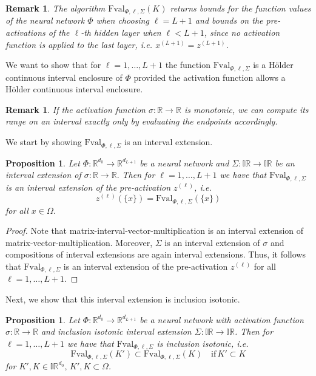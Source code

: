 \documentclass[a4paper, 11pt]{article}
\newtheorem{proposition}[theorem]{Proposition}
\newtheorem{remark}[theorem]{Remark}
\begin{document}
	\begin{remark}
		The algorithm $\mathrm{Fval}_{\Phi,\ell, \Sigma}(K)$ returns bounds for the function values of the neural network $\Phi$ when choosing $\ell=L+1$ and bounds on the pre-activations of the $\ell$-th hidden layer when $\ell < L+1$, since no activation function is applied to the last layer, i.e. $x^{(L+1)} = z^{(L+1)}$.
	\end{remark}
	
	
	
	
	We want to show that for $\ell=1,\dotsc,L+1$ the function $\mathrm{Fval}_{\Phi, \ell, \Sigma}$ is a Hölder continuous interval enclosure of $\Phi$ {provided} the activation function allows a Hölder continuous interval enclosure.
	\begin{remark}\label{rem:monotonicSigma}
		If the activation function $\sigma : \mathbb{R} \to \mathbb{R}$ is monotonic, we can compute its range on an interval exactly only by evaluating the endpoints accordingly.
	\end{remark}
	
	We start by showing $\mathrm{Fval}_{\Phi, \ell, \Sigma}$ is an interval extension.
	
	\begin{proposition}\label{prop: fval interval extension}
		Let $\Phi : \mathbb{R}^{d_0} \to \mathbb{R}^{d_{L+1}}$ be a neural network and $\Sigma:\mathbb{IR} \to \mathbb{IR}$ be an interval extension of $\sigma : \mathbb{R} \to \mathbb{R}.$ Then for $\ell=1,\dotsc, L+1$ we have that $\mathrm{Fval}_{\Phi, \ell, \Sigma}$ is {an} interval extension of the pre-activation $z^{(\ell)}$, i.e.
		$$ z^{(\ell)}(\{x\}) = \mathrm{Fval}_{\Phi, \ell, \Sigma}(\{x\}) $$
		for all $x\in \Omega$.
	\end{proposition}
	
	\begin{proof}
		Note that matrix-interval-vector-multiplication is an interval extension of
		matrix-vector-multiplication. Moreover, $\Sigma$ is an interval extension of $\sigma$ and compositions of interval extensions are again interval extensions. Thus, it follows that $\mathrm{Fval}_{\Phi, \ell, \Sigma}$ is an interval extension of the pre-activation $z^{(\ell)}$ for all $\ell =1, \dots, L+1$.
	\end{proof}
	
	Next, we show that this interval extension is inclusion isotonic.
	
	\begin{proposition}\label{prop: fval inclusion isotonic}
		Let $\Phi : \mathbb{R}^{d_0} \to \mathbb{R}^{d_{L+1}}$ be a neural network with activation function $\sigma : \mathbb{R} \to \mathbb{R}$ and inclusion isotonic interval extension $\Sigma: \mathbb{IR} \to \mathbb{IR}$. Then for $\ell=1,\dotsc, L+1$ we have that $\mathrm{Fval}_{\Phi, \ell, \Sigma}$ is inclusion isotonic, i.e.
		\begin{equation}
			\mathrm{Fval}_{\Phi, \ell, \Sigma}(K') \subset \mathrm{Fval}_{\Phi, \ell, \Sigma}(K) \quad \text{if}\, K' \subset K
		\end{equation}
		for $K',K \in \mathbb{IR}^{d_0}, \, K',K \subset \Omega$.
	\end{proposition}
	
\end{document}
